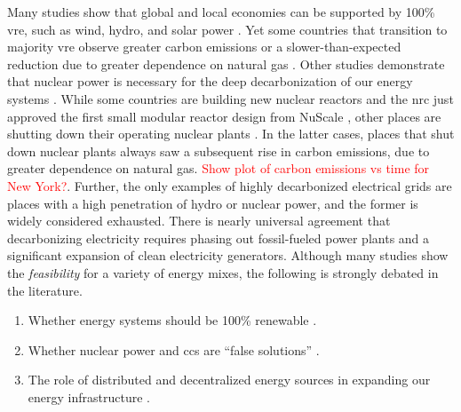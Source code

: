 Many studies show that global and local economies can be supported by 100\%
\ac{vre}, such as wind, hydro, and solar power \cite{jacobson_100_2015,
bussar_optimal_2014,brown_response_2018,dorotic_integration_2019,wallsgrove_emerging_2021,
cochran_la100_2021,cosic_100_2012,traber_economically_2021,bogdanov_full_2021,
bogdanov_north-east_2016,
esteban_100_2018,yue_least_2020,neumann_near-optimal_2021}. Yet some countries
that transition to majority \ac{vre} observe greater carbon emissions or a
slower-than-expected reduction due to greater dependence on natural gas
\cite{wagner_co2_2021}. Other studies demonstrate that nuclear power is
necessary for the deep decarbonization of our energy systems
\cite{wagner_co2_2021,dotson_influence_2022,greene_enhancing_2019,kim_carbon_2021,
lehtveer_how_2015,
de_sisternes_value_2016,alzbutas_uncertainty_2012,brook_why_2014,
epiney_economic_2020,petti_future_2018, patrizio_socially_2020}. While some
countries are building new nuclear reactors and the \ac{nrc} just approved the
first small modular reactor design from NuScale
\cite{office_of_nuclear_energy_science_and_technology_nrc_2023}, other places
are shutting down their operating nuclear plants \cite{johnson_new_2021}. In the
latter cases, places that shut down nuclear plants always saw a subsequent rise
in carbon emissions, due to greater dependence on natural gas.
\textcolor{red}{Show plot of carbon emissions vs time for New York?}. Further,
the only examples of highly decarbonized electrical grids are places with a high
penetration of hydro or nuclear power, and the former is widely considered
exhausted. There is nearly universal agreement that decarbonizing electricity
requires phasing out fossil-fueled power plants and a significant expansion of
clean electricity generators. Although many studies show the
\textit{feasibility} for a variety of energy mixes, the following is strongly
debated in the literature.
\begin{enumerate}
    \item Whether energy systems should be 100\% renewable
    \cite{heard_burden_2017, brown_response_2018}.
    \item Whether nuclear power and \ac{ccs} are ``false solutions''
    \cite{elmallah_frontlining_2022, brook_why_2014} .
    \item The role of distributed and decentralized energy sources in expanding
    our energy infrastructure
    \cite{pitt_assessing_2015,rinaldi_what_2022,parag_electricity_2016,wang_modeling_2020,
    morvaj_decarbonizing_2017,gilbert_can_2020,li_economic_2016,falke_multi-objective_2016}.
\end{enumerate}

